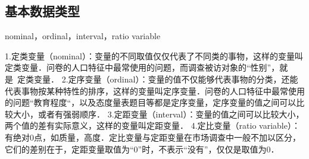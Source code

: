 \subsection{基本数据类型}
nominal，ordinal，interval，ratio variable

1.定类变量（nominal）：变量的不同取值仅仅代表了不同类的事物，这样的变量叫定类变量．问卷的人口特征中最常使用的问题，而调查被访对象的“性别”，就是 定类变量．
2.定序变量（ordinal）：变量的值不仅能够代表事物的分类，还能代表事物按某种特性的排序，这样的变量叫定序变量．问卷的人口特征中最常使用的问题“教育程度“，以及态度量表题目等都是定序变量，定序变量的值之间可以比较大小，或者有强弱顺序．
3.定距变量（interval）：变量的值之间可以比较大小，两个值的差有实际意义，这样的变量叫定距变量．
4.定比变量（ratio variable）：有绝对0点，如质量，高度．定比变量与定距变量在市场调查中一般不加以区分，它们的差别在于，定距变量取值为“0”时，不表示“没有”，仅仅是取值为0．
